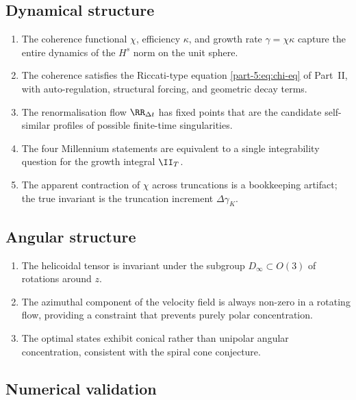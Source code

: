 \subsection{Dynamical structure}
\label{part-5:ssec:summary-dynamical}

\begin{enumerate}[label=(\Alph*),leftmargin=*]
\item The coherence functional $\chi$, efficiency $\kappa$, and 
      growth rate $\gamma = \chi\kappa$ capture the entire dynamics 
      of the $H^s$ norm on the unit sphere.
\item The coherence satisfies the Riccati-type equation 
      \eqref{part-5:eq:chi-eq} of Part~II, with auto-regulation, structural 
      forcing, and geometric decay terms.
\item The renormalisation flow $\RR_{\Delta t}$ has fixed points 
      that are the candidate self-similar profiles of possible 
      finite-time singularities.
\item The four Millennium statements are equivalent to a single 
      integrability question for the growth integral $\II_T$.
\item The apparent contraction of $\chi$ across truncations is a 
      bookkeeping artifact; the true invariant is the truncation 
      increment $\Delta\gamma_K$.
\end{enumerate}

\subsection{Angular structure}
\label{part-5:ssec:summary-angular}

\begin{enumerate}[label=(\Alph*),leftmargin=*]
\item The helicoidal tensor is invariant under the subgroup 
      $D_\infty\subset O(3)$ of rotations around $z$.
\item The azimuthal component of the velocity field is always 
      non-zero in a rotating flow, providing a constraint that 
      prevents purely polar concentration.
\item The optimal states exhibit conical rather than unipolar 
      angular concentration, consistent with the spiral cone 
      conjecture.
\end{enumerate}

\subsection{Numerical validation}
\label{part-5:ssec:summary-numeric}

